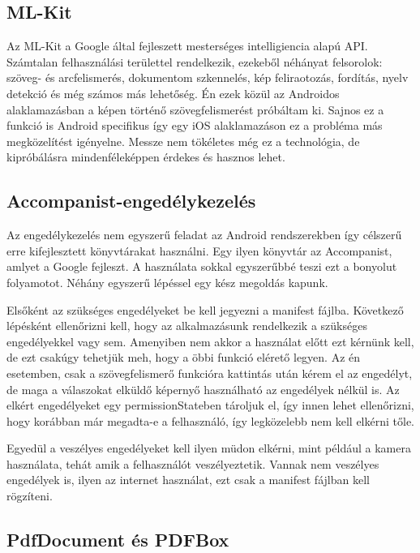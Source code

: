 \subsection{ML-Kit}
\label{sec:MLKit}

Az ML-Kit a Google által fejleszett mesterséges intelligiencia alapú API.
Számtalan felhasználási területtel rendelkezik, ezekeből néhányat felsorolok: szöveg- és arcfelismerés, dokumentom szkennelés, kép feliraotozás, fordítás, nyelv detekció és még számos más lehetőség.
Én ezek közül az Androidos alaklamazásban a képen történő szövegfelismerést próbáltam ki.\cite{MLKit}
Sajnos ez a funkció is Android specifikus így egy iOS alaklamazáson ez a probléma más megközelítést igényelne.
Messze nem tökéletes még ez a technológia, de kipróbálásra mindenféleképpen érdekes és hasznos lehet.

\subsection{Accompanist-engedélykezelés}

Az engedélykezelés nem egyszerű feladat az Android rendszerekben így célszerű erre kifejlesztett könyvtárakat használni.
Egy ilyen könyvtár az Accompanist, amlyet a Google fejleszt.
A használata sokkal egyszerűbbé teszi ezt a bonyolut folyamotot.
Néhány egyszerű lépéssel egy kész megoldás kapunk.

Elsőként az szükséges engedélyeket be kell jegyezni a manifest fájlba.
Következő lépésként ellenőrizni kell, hogy az alkalmazásunk rendelkezik a szükséges engedélyekkel vagy sem.
Amenyiben nem akkor a használat előtt ezt kérnünk kell, de ezt csakúgy tehetjük meh, hogy a öbbi funkció elérető legyen.
Az én esetemben, csak a szövegfelismerő funkcióra kattintás után kérem el az engedélyt, de maga a válaszokat elküldő képernyő használható az engedélyek nélkül is.
Az elkért engedélyeket egy permissionStateben tároljuk el, így innen lehet ellenőrizni, hogy korábban már megadta-e a felhasználó, így legközelebb nem kell elkérni tőle. \cite{Permissions}

Egyedül a veszélyes engedélyeket kell ilyen müdon elkérni, mint például a kamera használata, tehát amik a felhasználót veszélyeztetik.
Vannak nem veszélyes engedélyek is, ilyen az internet használat, ezt csak a manifest fájlban kell rögzíteni.

\subsection{PdfDocument és PDFBox}

